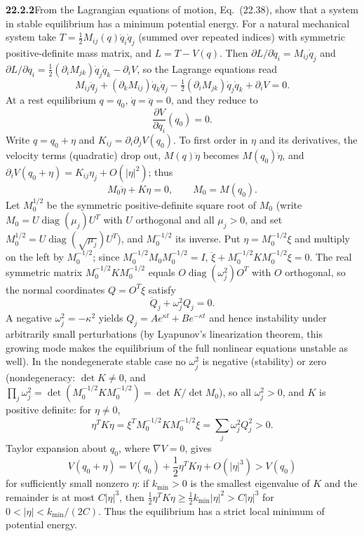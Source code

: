 \par\bigskip
\noindent\textbf{22.2.2}\quad From the Lagrangian equations of
motion, Eq.~(22.38), show that a system in stable equilibrium has
a minimum potential energy.
\solution
For a natural mechanical system take
$T=\tfrac12M_{ij}(q)\dot q_i\dot q_j$ (summed over repeated indices)
with symmetric positive-definite mass matrix, and $L=T-V(q)$. Then
$\partial L/\partial\dot q_i=M_{ij}\dot q_j$ and
$\partial L/\partial q_i
=\tfrac12(\partial_iM_{jk})\dot q_j\dot q_k-\partial_iV$, so the
Lagrange equations read
\[
M_{ij}\ddot q_j+(\partial_kM_{ij})\dot q_k\dot q_j
-\tfrac12(\partial_iM_{jk})\dot q_j\dot q_k+\partial_iV=0.
\]
At a rest equilibrium $q=q_0$, $\dot q=\ddot q=0$, and they reduce to
\[
\boxed{\frac{\partial V}{\partial q_i}(q_0)=0}.
\]
Write $q=q_0+\eta$ and
$K_{ij}=\partial_i\partial_jV(q_0)$. To first order in $\eta$ and its
derivatives, the velocity terms (quadratic) drop out,
$M(q)\ddot\eta$ becomes $M(q_0)\ddot\eta$, and
$\partial_iV(q_0+\eta)=K_{ij}\eta_j+O(|\eta|^2)$; thus
\[
M_0\ddot\eta+K\eta=0,\qquad M_0=M(q_0).
\]
Let $M_0^{1/2}$ be the symmetric positive-definite square root of $M_0$
(write $M_0=U\operatorname{diag}(\mu_j)U^T$ with $U$ orthogonal and all
$\mu_j>0$, and set $M_0^{1/2}=U\operatorname{diag}(\sqrt{\mu_j})U^T$),
and $M_0^{-1/2}$ its inverse. Put $\eta=M_0^{-1/2}\xi$ and multiply on
the left by $M_0^{-1/2}$; since $M_0^{-1/2}M_0M_0^{-1/2}=I$,
$\ddot\xi+M_0^{-1/2}KM_0^{-1/2}\xi=0$. The real symmetric matrix
$M_0^{-1/2}KM_0^{-1/2}$ equals $O\operatorname{diag}(\omega_j^2)O^T$
with $O$ orthogonal, so the normal coordinates $Q=O^T\xi$ satisfy
\[
\ddot Q_j+\omega_j^2Q_j=0.
\]
A negative $\omega_j^2=-\kappa^2$ yields
$Q_j=Ae^{\kappa t}+Be^{-\kappa t}$ and hence instability under
arbitrarily small perturbations (by Lyapunov's linearization theorem,
this growing mode makes the equilibrium of the full nonlinear equations
unstable as well). In the nondegenerate stable case no $\omega_j^2$ is
negative (stability) or zero (nondegeneracy: $\det K\ne0$, and
$\prod_j\omega_j^2=\det(M_0^{-1/2}KM_0^{-1/2})=\det K/\det M_0$),
so all $\omega_j^2>0$,
and $K$ is positive definite: for $\eta\ne0$,
\[
\eta^TK\eta=\xi^TM_0^{-1/2}KM_0^{-1/2}\xi=\sum_j\omega_j^2Q_j^2>0.
\]
Taylor expansion about $q_0$, where $\nabla V=0$, gives
\[
V(q_0+\eta)=V(q_0)+\frac12\eta^TK\eta+O(|\eta|^3)>V(q_0)
\]
for sufficiently small nonzero $\eta$: if $k_{\min}>0$ is the smallest
eigenvalue of $K$ and the remainder is at most $C|\eta|^3$, then
$\frac12\eta^TK\eta\ge\frac12k_{\min}|\eta|^2>C|\eta|^3$ for
$0<|\eta|<k_{\min}/(2C)$. Thus the equilibrium has a
strict local minimum of potential energy.

